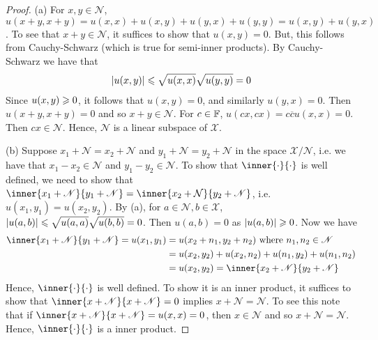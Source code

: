 \begin{proof}
    (a) For $x,y\in \mathscr{N}$, $u(x+y,x+y)=u(x,x)+u(x,y)+u(y,x)+u(y,y)=u(x,y)+u(y,x)$.
    To see that $x+y\in\mathscr{N}$, it suffices to show that $u(x,y)=0$.
    But, this follows from Cauchy-Schwarz (which is true for semi-inner products).
    By Cauchy-Schwarz we have that 
    \begin{align*}
        |u(x,y)|\leqslant \sqrt{u(x,x)}\sqrt{u(y,y)}=0
    \end{align*}
    Since $u(x,y)\geqslant 0$, it follows that $u(x,y)=0$,
    and similarly $u(y,x)=0$. Then $u(x+y,x+y)=0$ and so $x+y\in\mathscr{N}$.
    For $c\in\mathbb{F}$, $u(cx,cx)=c\overline{c}u(x,x)=0$. Then $cx\in \mathscr{N}$.
    Hence, $\mathscr{N}$ is a linear subspace of $\mathscr{X}$.
    \par
    (b) Suppose $x_1+\mathscr{N}=x_2+\mathscr{N}$ and $y_1+\mathscr{N}=y_2+\mathscr{N}$ in the space $\mathscr{X}/\mathscr{N}$, 
    i.e. we have that $x_1-x_2\in \mathscr{N}$ and $y_1-y_2\in\mathscr{N}$.
    To show that $\inner{\cdot}{\cdot}$ is well defined, we need to show that 
    $\inner{x_1+\mathscr{N}}{y_1+\mathscr{N}}=\inner{x_2+\mathcal{N}}{y_2+\mathscr{N}}$, 
    i.e. $u(x_1,y_1)=u(x_2,y_2)$. By (a), for $a\in\mathscr{N},b\in\mathscr{X}$, $|u(a,b)|\leqslant \sqrt{u(a,a)}\sqrt{u(b,b)}=0$. 
    Then $u(a,b)=0$ as $|u(a,b)|\geqslant 0$. Now we have 
    \begin{align*}
        \inner{x_1+\mathscr{N}}{y_1+\mathscr{N}} = u(x_1,y_1) &= u(x_2+n_1,y_2+n_2) \text{ where } n_1,n_2\in \mathscr{N}\\
                                                              &= u(x_2,y_2) + u(x_2,n_2) + u(n_1,y_2) + u(n_1,n_2)\\
                                                              &= u(x_2,y_2) =  \inner{x_2+\mathscr{N}}{y_2+\mathscr{N}}
    \end{align*}
    Hence, $\inner{\cdot}{\cdot}$ is well defined.
    To show it is an inner product, it suffices to show that 
    $\inner{x+\mathscr{N}}{x+\mathscr{N}}=0$ implies $x+\mathscr{N}=\mathscr{N}$.
    To see this note that if $\inner{x+\mathscr{N}}{x+\mathscr{N}}=u(x,x)=0$, then $x\in\mathscr{N}$ and so $x+\mathscr{N}=\mathscr{N}$. 
    Hence, $\inner{\cdot}{\cdot}$ is a inner product.
    
\end{proof}


